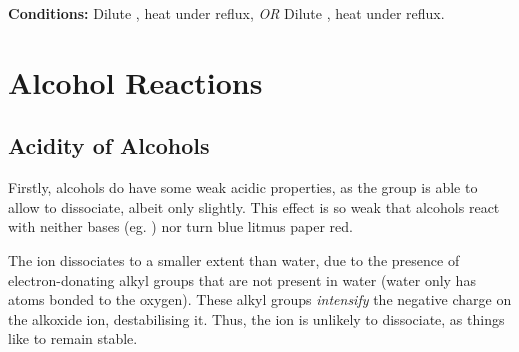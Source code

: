 			\vspace{1.5em}
			\vbox{\textbf{Conditions:}	\tabto{35mm}Dilute , heat under reflux, \textit{OR}
										\tabto{35mm}Dilute , heat under reflux.}





	\pagebreak
	\section{Alcohol Reactions}

		\subsection{Acidity of Alcohols}

			Firstly, alcohols do have some weak acidic properties, as the  group is able to allow  to dissociate, albeit
			only slightly. This effect is so weak that alcohols react with neither bases (eg. ) nor turn blue litmus paper red.

			The  ion dissociates to a smaller extent than water, due to the presence of electron-donating alkyl groups that are
			not present in water (water only has  atoms bonded to the oxygen). These alkyl groups \textit{intensify} the negative
			charge on the alkoxide ion, destabilising it. Thus, the  ion is unlikely to dissociate, as things like to remain stable.

